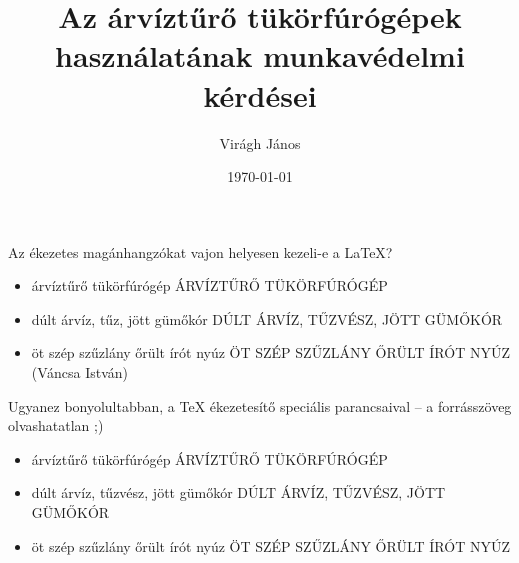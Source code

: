 \documentclass{article}
\title{Az árvíztűrő tükörfúrógépek használatának munkavédelmi kérdései}
\author{Virágh János}
\date{\today}
\begin{document}
\maketitle

Az ékezetes magánhangzókat vajon helyesen kezeli-e a \LaTeX{}?

\begin{itemize}
	\item árvíztűrő tükörfúrógép ÁRVÍZTŰRŐ TÜKÖRFÚRÓGÉP
	\item dúlt árvíz, tűz, jött gümőkór DÚLT ÁRVÍZ, TŰZVÉSZ, JÖTT GÜMŐKÓR
	\item öt szép szűzlány őrült írót nyúz ÖT SZÉP SZŰZLÁNY ŐRÜLT ÍRÓT NYÚZ (Váncsa István)
\end{itemize}

Ugyanez bonyolultabban, a \TeX{} ékezetesítő speciális parancsaival -- a forrásszöveg olvashatatlan ;)
\begin{itemize}
	\item \'arv\'izt\H{u}r\H{o} t\"uk\"orf\'ur\'og\'ep \'ARV\'IZT\H{U}R\H{O} T\"UK\"ORF\'UR\'OG\'EP
	\item d\'ult \'arv\'iz, t\H{u}zv\'esz, j\"ott g\"um\H{o}k\'or D\'ULT \'ARV\'IZ, T\H{U}ZV\'ESZ, J\"OTT G\"UM\H{O}K\'OR
	\item \"ot sz\'ep sz\H{u}zl\'any \H{o}r\"ult \'ir\'ot ny\'uz \"OT SZ\'EP SZ\H{U}ZL\'ANY \H{O}R\"ULT \'IR\'OT NY\'UZ
\end{itemize}
\end{document}
